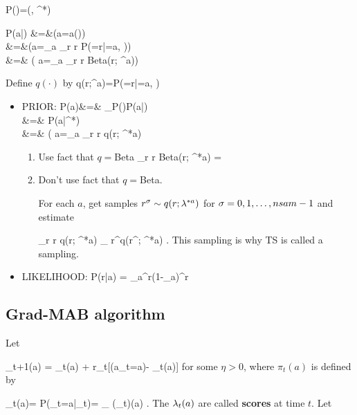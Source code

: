 \beq
P(\lam)=\indi(\lam, \lam^*)
\eeq

\beqa
P(a|\lam)
&=&\indi(a=a(\lam))
\\
&=&\indi(a=\argmax_a \sum_r r P(=r|=a, \lam))
\\
&=& \indi( a=\argmax_a \sum_r r {\rm Beta}(r; \lam^a))
\;\;
\eeqa

Define $q(\cdot)$ by
\beq
q(r;\lam^a)=P(=r|=a, \lam)
\eeq

\begin{itemize}
\item PRIOR:
\beqa
P(a)&=&
\sum_\lam P(\lam)P(a|\lam)
\\
&=&
P(a|\lam^*)
\\
&=&
\indi( a=\argmax_a
 \sum_r r q(r; \lam^{*a})
\eeqa


\begin{enumerate}
\item Use fact that $q=$Beta
\beq
\sum_r r {\rm Beta}(r; \lam^{*a})
=
\eeq

\item Don't use fact that $q=$Beta.

 For each $a$,
get samples $r^\sigma \sim
q(r; \lambda^{*a})$
for $\sigma=0, 1, \ldots, nsam-1$
and estimate

\beq
\sum_r r q(r; \lam^{*a})
\approx
{}\sum_\s
r^\s q(r^\s; \lam^{*a})
\;.
\eeq
This sampling is why TS is called a sampling.
\end{enumerate}


\item LIKELIHOOD:
\beq
P(r|a) =
\mu_{a}^{r}(1-\mu_{a})^{r}
\;\;
\eeq
\end{itemize}



\subsection{Grad-MAB algorithm}

Let

\beq
\lam_{t+1}(a)
=
\lam_{t}(a)
+ \eta
r_{t}[\indi(a_{t}=a)-
\pi_{t}(a)]
\label{eq-mab-lam-recur}
\eeq
for some $\eta>0$, where
$\pi_t(a)$ is defined by

\beq
\pi_t(a)=
P(\rva_t=a|\lam_t)=
_{
\softmax(\lam_t)(a)}
\;.
\eeq
The $\lambda_t(a)$ are called {\bf scores}
at time $t$. 
Let

\beq
{}
\eeq

